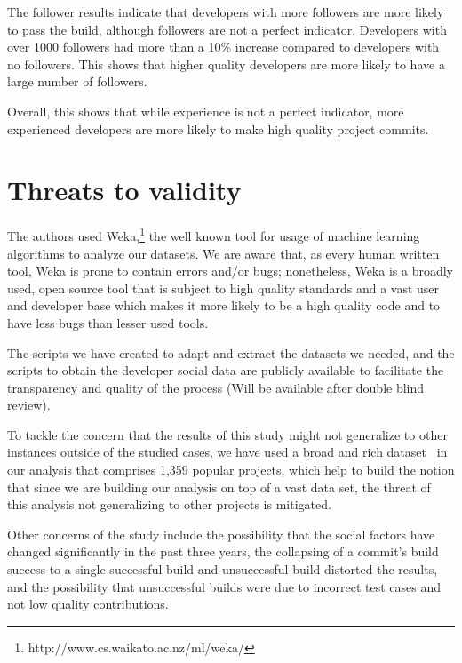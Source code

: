 \documentclass[10pt, conference]{IEEEtran}
\begin{document}
The follower results indicate that developers with more followers are more
likely to pass the build, although followers are not a perfect indicator.
Developers with over 1000 followers had more than a 10\% increase compared to
developers with no followers.  This shows that higher quality developers are more
likely to have a large number of followers.

Overall, this shows that while experience is not a perfect indicator, more
experienced developers are more likely to make high quality project commits.

\section{Threats to validity}

 The authors used 
 Weka,\footnote{http://www.cs.waikato.ac.nz/ml/weka/} the well known tool for 
 usage of machine learning algorithms to analyze our datasets. We are aware that, 
 as every human written tool, Weka is prone to contain errors and/or bugs; 
 nonetheless, Weka is a broadly used, open source tool that is subject to high 
 quality standards and a vast user and developer base which makes it more likely 
 to be a high quality code and to have less bugs than lesser used tools.
 
 The scripts we have created to adapt and extract the datasets we needed, and the 
 scripts to obtain the developer social data are publicly available to facilitate 
 the transparency and quality of the process (Will be available after double blind review).%

 To tackle the concern that the results of this study might not generalize to 
 other instances outside of the studied cases, we have used a broad and rich 
 dataset~\cite{msr17challenge} in our analysis that comprises 1,359 popular projects, which help to 
 build the notion that since we are building our analysis on top of a vast 
 data set, the threat of this analysis 
 not generalizing to other projects is mitigated.

 Other concerns of the study include the possibility that the social factors
 have changed significantly in the past three years, the collapsing of a
 commit's build success to a single successful build and unsuccessful build
 distorted the results, and the possibility that unsuccessful builds were due to
 incorrect test cases and not low quality contributions.
\end{document}
